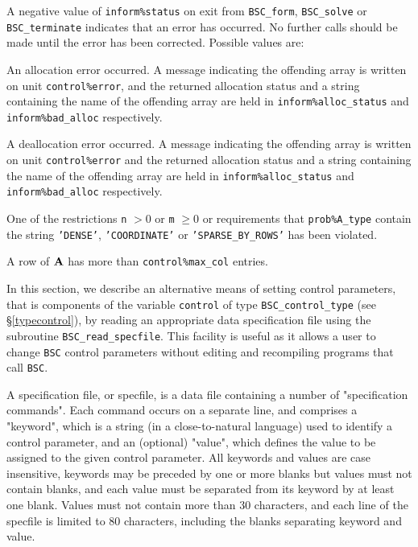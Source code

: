 \documentclass{galahad}
\newcommand{\packagename}{BSC}
\begin{document}
\galerrors
A negative value of {\tt inform\%status} on exit from 
{\tt \packagename\_form}, 
{\tt \packagename\_solve}
or 
{\tt \packagename\_terminate}
indicates that an error has occurred. No further calls should be made
until the error has been corrected. Possible values are:

\begin{description}

 An allocation error occurred. 
A message indicating the offending 
array is written on unit {\tt control\%error}, and the returned allocation 
status and a string containing the name of the offending array
are held in {\tt inform\%alloc\_\-status}
and {\tt inform\%bad\_alloc} respectively.

 A deallocation error occurred. 
A message indicating the offending 
array is written on unit {\tt control\%error} and the returned allocation 
status and a string containing the name of the offending array
are held in {\tt inform\%alloc\_\-status}
and {\tt inform\%bad\_alloc} respectively.

 One of the restrictions 
   {\tt n} $> 0$ or {\tt m} $\geq  0$
    or requirements that {\tt prob\%A\_type}
    contain the string
    {\tt 'DENSE'}, {\tt 'COORDINATE'} or {\tt 'SPARSE\_BY\_ROWS'}
    has been violated.

\itt{\galerrschurcomplement}
A row of ${\mathbf{A}}$ has more than {\tt control\%max\_col} entries.

\end{description}


\galfeatures
\noindent In this section, we describe an alternative means of setting 
control parameters, that is components of the variable {\tt control} of type
{\tt \packagename\_control\_type}
(see \S\ref{typecontrol}), 
by reading an appropriate data specification file using the
subroutine {\tt \packagename\_read\_specfile}. This facility
is useful as it allows a user to change  {\tt \packagename} control parameters 
without editing and recompiling programs that call {\tt \packagename}.

A specification file, or specfile, is a data file containing a number of 
"specification commands". Each command occurs on a separate line, 
and comprises a "keyword", 
which is a string (in a close-to-natural language) used to identify a 
control parameter, and 
an (optional) "value", which defines the value to be assigned to the given
control parameter. All keywords and values are case insensitive, 
keywords may be preceded by one or more blanks but
values must not contain blanks, and
each value must be separated from its keyword by at least one blank.
Values must not contain more than 30 characters, and 
each line of the specfile is limited to 80 characters,
including the blanks separating keyword and value.
\end{document}
